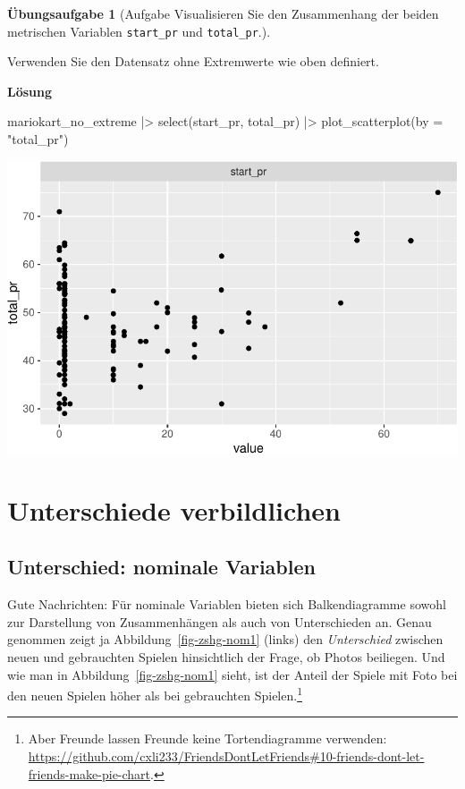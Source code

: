 \documentclass[
  letterpaper,
]{scrbook}
\newenvironment{Shaded}{\begin{snugshade}}{\end{snugshade}}
\newcommand{\AttributeTok}[1]{\textcolor[rgb]{0.40,0.45,0.13}{#1}}
\newcommand{\FunctionTok}[1]{\textcolor[rgb]{0.28,0.35,0.67}{#1}}
\newcommand{\NormalTok}[1]{\textcolor[rgb]{0.00,0.23,0.31}{#1}}
\newcommand{\SpecialCharTok}[1]{\textcolor[rgb]{0.37,0.37,0.37}{#1}}
\newcommand{\StringTok}[1]{\textcolor[rgb]{0.13,0.47,0.30}{#1}}
\theoremstyle{definition}
\theoremstyle{definition}
\theoremstyle{definition}
\newtheorem{exercise}{Übungsaufgabe}[chapter]
\theoremstyle{remark}
\begin{document}
\begin{exercise}[Aufgabe Visualisieren Sie den Zusammenhang der beiden
metrischen Variablen \texttt{start\_pr} und
\texttt{total\_pr}.]\protect\hypertarget{exr-zsmnhang-metrisch}{}\label{exr-zsmnhang-metrisch}

Verwenden Sie den Datensatz ohne Extremwerte wie oben definiert.

\textbf{Lösung}

\begin{Shaded}
\begin{Highlighting}[]
\NormalTok{mariokart\_no\_extreme }\SpecialCharTok{|\textgreater{}} 
  \FunctionTok{select}\NormalTok{(start\_pr, total\_pr) }\SpecialCharTok{|\textgreater{}} 
  \FunctionTok{plot\_scatterplot}\NormalTok{(}\AttributeTok{by =} \StringTok{"total\_pr"}\NormalTok{)}
\end{Highlighting}
\end{Shaded}

\begin{center}
\includegraphics[width=0.7\linewidth,height=\textheight,keepaspectratio]{040-verbildlichen_files/figure-pdf/unnamed-chunk-28-1.pdf}
\end{center}

\end{exercise}

\section{Unterschiede verbildlichen}\label{unterschiede-verbildlichen}

\subsection{Unterschied: nominale
Variablen}\label{unterschied-nominale-variablen}

Gute Nachrichten: Für nominale Variablen bieten sich Balkendiagramme
sowohl zur Darstellung von Zusammenhängen als auch von Unterschieden an.
Genau genommen zeigt ja Abbildung~\ref{fig-zshg-nom1} (links) den
\emph{Unterschied} zwischen neuen und gebrauchten Spielen hinsichtlich
der Frage, ob Photos beiliegen. Und wie man in
Abbildung~\ref{fig-zshg-nom1} sieht, ist der Anteil der Spiele mit Foto
bei den neuen Spielen höher als bei gebrauchten Spielen.\footnote{Aber
  Freunde lassen Freunde keine Tortendiagramme verwenden:
  \url{https://github.com/cxli233/FriendsDontLetFriends\#10-friends-dont-let-friends-make-pie-chart}.}
\end{document}
